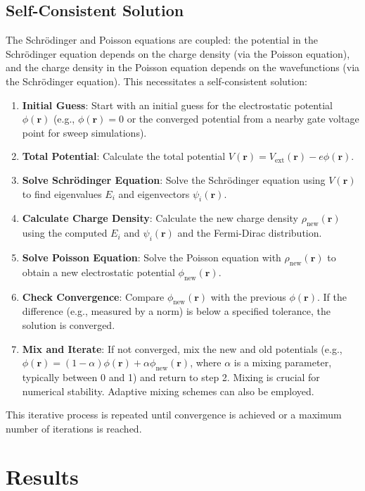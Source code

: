 \documentclass{article}
\begin{document}
\subsection{Self-Consistent Solution}
The Schrödinger and Poisson equations are coupled: the potential in the Schrödinger equation depends on the charge density (via the Poisson equation), and the charge density in the Poisson equation depends on the wavefunctions (via the Schrödinger equation). This necessitates a self-consistent solution:
\begin{enumerate}
	\item \textbf{Initial Guess}: Start with an initial guess for the electrostatic potential $\phi(\mathbf{r})$ (e.g., $\phi(\mathbf{r}) = 0$ or the converged potential from a nearby gate voltage point for sweep simulations).
	\item \textbf{Total Potential}: Calculate the total potential $V(\mathbf{r}) = V_{\text{ext}}(\mathbf{r}) - e \phi(\mathbf{r})$.
	\item \textbf{Solve Schrödinger Equation}: Solve the Schrödinger equation using $V(\mathbf{r})$ to find eigenvalues $E_i$ and eigenvectors $\psi_i(\mathbf{r})$.
	\item \textbf{Calculate Charge Density}: Calculate the new charge density $\rho_{\text{new}}(\mathbf{r})$ using the computed $E_i$ and $\psi_i(\mathbf{r})$ and the Fermi-Dirac distribution.
	\item \textbf{Solve Poisson Equation}: Solve the Poisson equation with $\rho_{\text{new}}(\mathbf{r})$ to obtain a new electrostatic potential $\phi_{\text{new}}(\mathbf{r})$.
	\item \textbf{Check Convergence}: Compare $\phi_{\text{new}}(\mathbf{r})$ with the previous $\phi(\mathbf{r})$. If the difference (e.g., measured by a norm) is below a specified tolerance, the solution is converged.
	\item \textbf{Mix and Iterate}: If not converged, mix the new and old potentials (e.g., $\phi(\mathbf{r}) = (1-\alpha)\phi(\mathbf{r}) + \alpha\phi_{\text{new}}(\mathbf{r})$, where $\alpha$ is a mixing parameter, typically between 0 and 1) and return to step 2. Mixing is crucial for numerical stability. Adaptive mixing schemes can also be employed.
\end{enumerate}
This iterative process is repeated until convergence is achieved or a maximum number of iterations is reached.

\section{Results}
\end{document}
